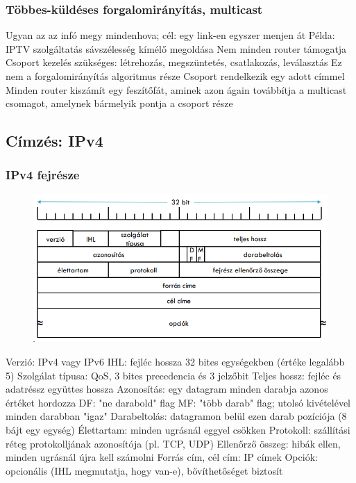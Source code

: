 \documentclass[12pt,a4paper]{article}
\begin{document}
\pagebreak

\subsubsection{Többes-küldéses forgalomirányítás, multicast}

\begin{outline}
	\1 Ugyan az az infó megy mindenhova; cél: egy link-en egyszer menjen át
		\2 Példa: IPTV szolgáltatás sávszélesség kímélő megoldása
	\1 Nem minden router támogatja
	\1 Csoport kezelés szükséges: létrehozás, megszüntetés, csatlakozás, leválasztás
		\2 Ez nem a forgalomirányítás algoritmus része
		\2 Csoport rendelkezik egy adott címmel
	\1 Minden router kiszámít egy feszítőfát, aminek azon ágain továbbítja a multicast csomagot, amelynek bármelyik pontja a csoport része
\end{outline}

\pagebreak

\subsection{Címzés: IPv4}

\subsubsection{IPv4 fejrésze}

\begin{figure}[h!]
	\centering
	\includegraphics[width=0.8\linewidth]{ipv4-header}
\end{figure}

\begin{outline}
	\1 Verzió: IPv4 vagy IPv6
	\1 IHL: fejléc hossza 32 bites egységekben (értéke legalább 5)
	\1 Szolgálat típusa: QoS, 3 bites precedencia és 3 jelzőbit
	\1 Teljes hossz: fejléc és adatréssz együttes hossza
	\1 Azonosítás: egy datagram minden darabja azonos értéket hordozza
	\1 DF: "ne darabold" flag
	\1 MF: "több darab" flag; utolsó kivételével minden darabban "igaz"
	\1 Darabeltolás: datagramon belül ezen darab pozíciója (8 bájt egy egység)
	\1 Élettartam: minden ugrásnál eggyel csökken
	\1 Protokoll: szállítási réteg protokolljának azonosítója (pl. TCP, UDP)
	\1 Ellenőrző összeg: hibák ellen, minden ugrásnál újra kell számolni
	\1 Forrás cím, cél cím: IP címek
	\1 Opciók: opcionális (IHL megmutatja, hogy van-e), bővíthetőséget biztosít
\end{outline}
\end{document}
